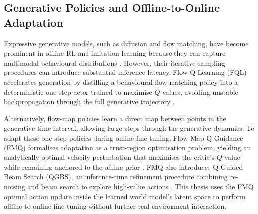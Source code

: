 \subsection{Generative Policies and Offline-to-Online Adaptation}

Expressive generative models, such as diffusion and flow matching, have
become prominent in offline RL and imitation learning because they can
capture multimodal behavioural distributions
\cite{chi2024diffusionpolicyvisuomotorpolicy,lipman2023flowmatchinggenerativemodeling,tong2024improvinggeneralizingflowbasedgenerative}.
However, their iterative sampling procedures can introduce substantial
inference latency. Flow Q-Learning (FQL) accelerates generation by
distilling a behavioural flow-matching policy into a deterministic
one-step actor trained to maximise $Q$-values, avoiding unstable
backpropagation through the full generative trajectory
\cite{park2025flowqlearning}.

Alternatively, flow-map policies learn a direct map between points in
the generative-time interval, allowing large steps through the
generative dynamics. To adapt these one-step policies during online
fine-tuning, Flow Map Q-Guidance (FMQ) formalises adaptation as a
trust-region optimisation problem, yielding an analytically optimal
velocity perturbation that maximises the critic's $Q$-value while
remaining anchored to the offline prior
\cite{ziakas2026aligningflowmappolicies}. FMQ also introduces
Q-Guided Beam Search (QGBS), an inference-time refinement procedure
combining re-noising and beam search to explore high-value actions
\cite{ziakas2026aligningflowmappolicies}. This thesis uses the FMQ
optimal action update inside the learned world model's latent space to
perform offline-to-online fine-tuning without further real-environment
interaction.




